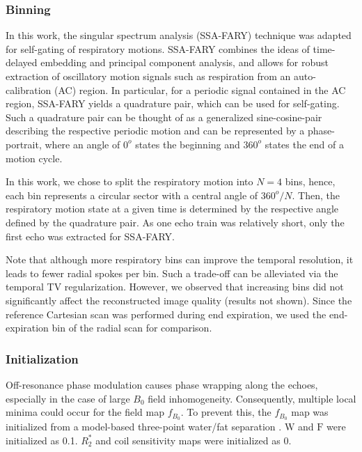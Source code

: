 \documentclass[journal,twoside,web]{ieeecolor}
\begin{document}
\subsubsection*{Binning}

In this work, the singular spectrum analysis (SSA-FARY) technique 
\cite{rosenzweig_2020_ssa} 
was adapted for self-gating of respiratory motions. 
SSA-FARY combines the ideas of time-delayed embedding and principal component analysis, 
and allows for robust extraction of oscillatory motion signals 
such as respiration from an auto-calibration (AC) region. 
In particular, for a periodic signal contained in the AC region, 
SSA-FARY yields a quadrature pair, which can be used for self-gating. 
Such a quadrature pair can be thought of as a generalized sine-cosine-pair 
describing the respective periodic motion and can be represented by a phase-portrait, 
where an angle of $0^o$ states the beginning and $360^o$ states the end of a motion cycle. 

In this work, we chose to split the respiratory motion into $N = 4$ bins, 
hence, each bin represents a circular sector with a central angle of $360^o / N$. 
Then, the respiratory motion state at a given time is determined by 
the respective angle defined by the quadrature pair.
As one echo train was relatively short, 
only the first echo was extracted for SSA-FARY.

Note that although more respiratory bins can improve the temporal resolution, 
it leads to fewer radial spokes per bin. Such a trade-off can be alleviated 
via the temporal TV regularization. However, we observed that increasing bins 
did not significantly affect the reconstructed image quality (results not shown). 
Since the reference Cartesian scan was performed during end expiration, 
we used the end-expiration bin of the radial scan for comparison.

\subsubsection*{Initialization}

Off-resonance phase modulation causes phase wrapping along the echoes, 
especially in the case of large $B_0$ field inhomogeneity. 
Consequently, multiple local minima could occur for the field map $f_{B_0}$. 
To prevent this, the $f_{B_0}$ map was initialized 
from a model-based three-point water/fat separation \cite{tan_2019_mobawf}. 
$\mathrm{W}$ and $\mathrm{F}$ were initialized as \num{0.1}. 
${R_2^*}$ and coil sensitivity maps were initialized as \num{0}.
\end{document}
